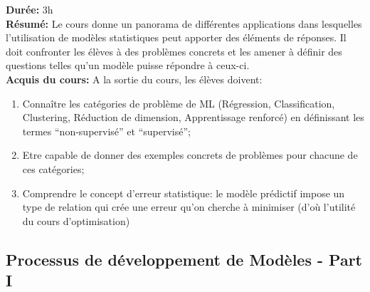 \documentclass[12pt,a4paper]{article}
\begin{document}
\textbf{Durée:} 3h\\
\textbf{Résumé:} Le cours donne un panorama de différentes applications dans lesquelles l’utilisation de modèles statistiques peut apporter des éléments de réponses. Il doit confronter les élèves à des problèmes concrets et les amener à définir des questions telles qu’un modèle puisse répondre à ceux-ci.\\
\textbf{Acquis du cours:} A la sortie du cours, les élèves doivent:
\begin{enumerate}
\item Connaître les catégories de problème de ML (Régression, Classification, Clustering, Réduction de dimension, Apprentissage renforcé) en définissant les termes “non-supervisé” et “supervisé”;
\item Etre capable de donner des exemples concrets de problèmes pour chacune de ces catégories;
\item Comprendre le concept d’erreur statistique: le modèle prédictif impose un type de relation qui crée une erreur qu’on cherche à minimiser (d’où l’utilité du cours d’optimisation)
\end{enumerate}



\subsection{Processus de développement de Modèles - Part I}
\end{document}
